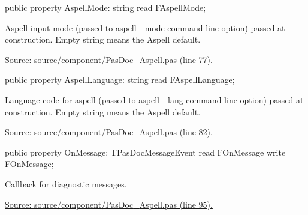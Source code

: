 \documentclass{report}
\newif\ifpdf
\begin{document}
\begin{list}{}{
\setlength{\itemindent}{0cm}
\setlength{\listparindent}{0cm}
\setlength{\leftmargin}{\evensidemargin}
\addtolength{\leftmargin}{\tmplength}
\settowidth{\labelsep}{X}
\addtolength{\leftmargin}{\labelsep}
\setlength{\labelwidth}{\tmplength}
}
\label{PasDoc_Aspell.TAspellProcess-AspellMode}
\item[\textbf{AspellMode}\hfill]
\ifpdf
\begin{flushleft}
\fi
\begin{ttfamily}
public property AspellMode: string read FAspellMode;\end{ttfamily}

\ifpdf
\end{flushleft}
\fi


\par Aspell input mode (passed to aspell {-}{-}mode command{-}line option) passed at construction. Empty string means the Aspell default.\par
\href{https://github.com/pasdoc/pasdoc/blob/master/source/component/PasDoc_Aspell.pas#L77}{Source: source/component/PasDoc{\_}Aspell.pas (line 77).}\label{PasDoc_Aspell.TAspellProcess-AspellLanguage}
\item[\textbf{AspellLanguage}\hfill]
\ifpdf
\begin{flushleft}
\fi
\begin{ttfamily}
public property AspellLanguage: string read FAspellLanguage;\end{ttfamily}

\ifpdf
\end{flushleft}
\fi


\par Language code for aspell (passed to aspell {-}{-}lang command{-}line option) passed at construction. Empty string means the Aspell default.\par
\href{https://github.com/pasdoc/pasdoc/blob/master/source/component/PasDoc_Aspell.pas#L82}{Source: source/component/PasDoc{\_}Aspell.pas (line 82).}\label{PasDoc_Aspell.TAspellProcess-OnMessage}
\item[\textbf{OnMessage}\hfill]
\ifpdf
\begin{flushleft}
\fi
\begin{ttfamily}
public property OnMessage: TPasDocMessageEvent read FOnMessage write FOnMessage;\end{ttfamily}

\ifpdf
\end{flushleft}
\fi


\par Callback for diagnostic messages.\par
\href{https://github.com/pasdoc/pasdoc/blob/master/source/component/PasDoc_Aspell.pas#L95}{Source: source/component/PasDoc{\_}Aspell.pas (line 95).}\end{list}
\end{document}
